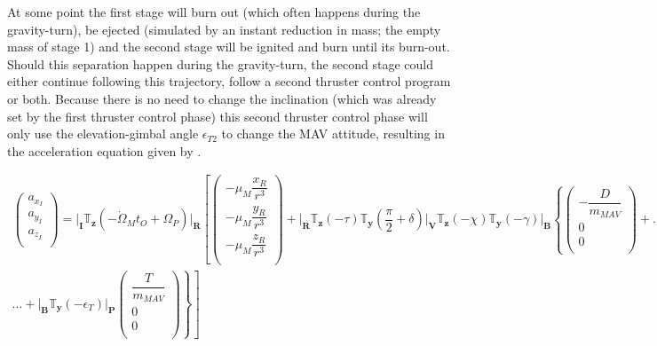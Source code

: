 


At some point the first stage will burn out (which often happens during the gravity-turn), be ejected (simulated by an instant reduction in mass; the empty mass of stage 1) and the second stage will be ignited and burn until its burn-out. Should this separation happen during the gravity-turn, the second stage could either continue following this trajectory, follow a second thruster control program or both. Because there is no need to change the inclination (which was already set by the first thruster control phase) this second thruster control phase will only use the elevation-gimbal angle $\epsilon_{T2}$ to change the \ac{MAV} attitude, resulting in the acceleration equation given by .

\begin{multline} \label{eq:second_thrust_eom}
\begin{pmatrix}
a_{x_{I}}\\
a_{y_{I}}\\
a_{z_{I}}\\
\end{pmatrix}
=
\Bigg|_{\mathbf{I}}\mathbb{T}_{\mathbf{z}}\left(-\dot{\Omega}_{M}t_{O}+\Omega_{P}\right)\Bigg|_{\mathbf{R}}\left[
\begin{pmatrix}
-\mu_{M}\dfrac{x_{R}}{r^{3}}\\
-\mu_{M}\dfrac{y_{R}}{r^{3}}\\
-\mu_{M}\dfrac{z_{R}}{r^{3}}\\
\end{pmatrix}
+\Bigg|_{\mathbf{R}}\mathbb{T}_{\mathbf{z}}\left(-\tau\right)\mathbb{T}_{\mathbf{y}}\left(\dfrac{\pi}{2}+\delta\right)\Bigg|_{\mathbf{V}}\mathbb{T}_{\mathbf{z}}\left(-\chi\right)\mathbb{T}_{\mathbf{y}}\left(-\gamma\right)\Bigg|_{\mathbf{B}}\left\lbrace
\begin{pmatrix}
-\dfrac{D}{m_{MAV}}\\
0\\
0\\
\end{pmatrix}
+ \right. \right. \dots \\
\dots +
\left. \left.
\Bigg|_{\mathbf{B}}\mathbb{T}_{\mathbf{y}}\left(-\epsilon_{T}\right)\Bigg|_{\mathbf{P}}
\begin{pmatrix}
\dfrac{T}{m_{MAV}}\\
0\\
0\\
\end{pmatrix}
\right\rbrace
\right]
\end{multline}


